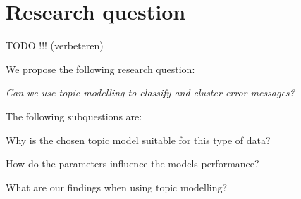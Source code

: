 \section{Research question}\label{introduction:Researchquestion}
TODO !!! (verbeteren)

We propose the following research question:

\parindent \textit{Can we use topic modelling to classify and cluster error messages?}

The following subquestions are:

Why is the chosen topic model suitable for this type of data?

How do the parameters influence the models performance?

What are our findings when using topic modelling?


\begin{comment}
What are the optimal parameters?

What are the pro's and con's of using LDA?

subquestions:
Why is LDA suitable for this type of data 

How do the parameters influence the models performance?

What are the pro's and con's of using LDA?

What other methods are available to solve this error clustering?


\end{comment}


\begin{comment}

How do we define similair messages?

Can we cluster these error messages to find patterns?

Wat ik zou verwachten in je scriptie zijn de volgende topics
•	Wat is het probleem (de probleemstelling)?
•	Welke mogelijkheden zijn er om dit probleem op te lossen?
•	Welke methode heb je gekozen, en vooral uitleggen waarom deze methode volgens jou de beste is?
•	Hoe heb je vastgesteld dat de gekozen oplossing de beste is?
•	Wat is de uitkomst?
•	Wat zijn de voor en nadelen van het gekozen model, wat zijn de beperkingen, wat is de optimale modelering en waarom?
Zijn deze onderwerpen voldoende afgedicht in onderstaande structuur?

Ik ben veel meer geïnteresseerd in de onderbouwing:
•	Wat is de (onze) probleem omschrijving
Finding structures in syslogs to cluster undiscovered syslogs with errors
•	Waarom kies je LDA om dit probleem te lijf te gaan
o	Pro’s / con’s
o	Alternatieven
•	Hoe moet LDA gebruikt worden
o	Welke specifieke tuning heb je gebruikt
o	Hoe beinvloed de aanpassingen van parameters de uitkomst


\textbf{Can we make a reliable model for error detection in system logs?}

 \end{comment}
 
